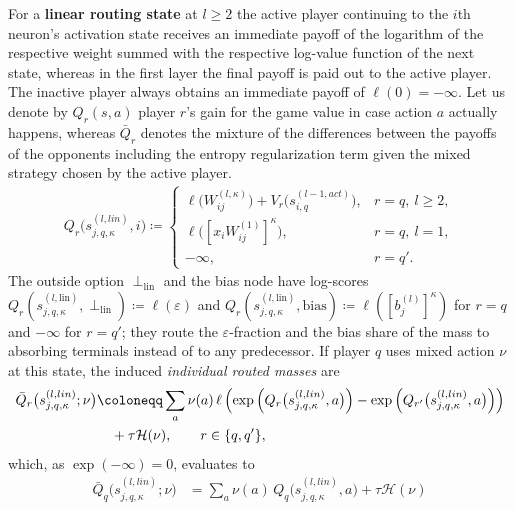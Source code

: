 \begin{definition}
For a \textbf{linear routing state} at $l \geq 2$ the active player continuing to the $i$th
neuron's activation state receives an immediate payoff of the logarithm of the respective weight
summed with the respective log-value function of the next state, whereas in the first layer the
final payoff is paid out to the active player. The inactive player always obtains an immediate
payoff of $\ell(0) = -\infty$. Let us denote by $Q_r(s, a)$ player $r$'s gain for the game value in
case action $a$ actually happens, whereas $\bar Q_r$ denotes the mixture of the differences between
the payoffs of the opponents including the entropy regularization term given the mixed strategy
chosen by the active player.
\begin{align}\label{ptnb:eq:routing-linear-action}
    Q_r \bigl( s_{j,q,\kappa}^{(l, lin)}, i \bigr)
    \coloneqq
    \begin{cases}
        \ell\!\bigl(W_{ij}^{(l,\kappa)}\bigr) + V_r\bigl(s_{i,q}^{(l-1, act)}\bigr), & r=q,\ l \ge 2,\\[0.35em]
        \ell\!\bigl([x_iW_{ij}^{(1)}]^\kappa\bigr), & r=q,\ l = 1,\\[0.35em]
        -\infty, & r=q'.
    \end{cases}
\end{align}
The outside option $\perp_{\mathrm{lin}}$ and the bias node have log-scores
$Q_r(s_{j,q,\kappa}^{(l,\mathrm{lin})}, \perp_{\mathrm{lin}}) \coloneqq \ell(\varepsilon)$ and
$Q_r(s_{j,q,\kappa}^{(l,\mathrm{lin})}, \mathrm{bias}) \coloneqq \ell([b_j^{(l)}]^\kappa)$ for $r =
    q$ and $-\infty$ for $r = q'$; they route the $\varepsilon$-fraction and the bias share of the mass
to absorbing terminals instead of to any predecessor.
If player $q$ uses mixed action $\nu$ at this state, the induced \emph{individual routed masses}
are
\begin{align}\label{ptnb:eq:optimal-linear}
    \bar Q_r \bigl( s_{j,q,\kappa}^{(l, lin)};\nu \bigr)
    &\coloneqq
    \sum_a \nu(a)\, \ell \left( \exp \left( Q_r \bigl( s_{j,q,\kappa}^{(l, lin)}, a \bigr) \right) -
    \exp \left( Q_{r'} \bigl( s_{j,q,\kappa}^{(l, lin)}, a \bigr) \right) \right) \notag\\
    &\quad + \tau \mathcal{H}(\nu),
    \qquad r \in \{q,q'\},
\end{align}
which, as $\exp(-\infty)=0$, evaluates to
\begin{align}
    \bar Q_q \bigl( s_{j,q,\kappa}^{(l, lin)};\nu \bigr)
    &=
    \sum_a \nu(a)\, Q_q \bigl( s_{j,q,\kappa}^{(l, lin)}, a \bigr)
    + \tau \mathcal{H}(\nu) \\

\end{align}
\end{definition}
